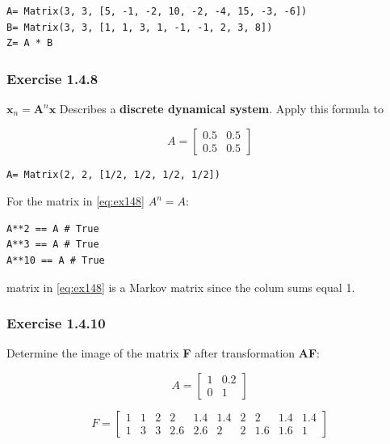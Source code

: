 \documentclass[a4paper]{article}
\begin{document}
\begin{verbatim}
A= Matrix(3, 3, [5, -1, -2, 10, -2, -4, 15, -3, -6])
B= Matrix(3, 3, [1, 1, 3, 1, -1, -1, 2, 3, 8])
Z= A * B
\end{verbatim}

\subsubsection{Exercise 1.4.8}

$\mathbf{x}_n = \mathbf{A}^n\mathbf{x}$ Describes a \textbf{discrete dynamical
system}. Apply this formula to

\begin{equation}\label{eq:ex148}
A = \left[\begin{matrix}0.5 & 0.5\\0.5 & 0.5\end{matrix}\right]
\end{equation}

\begin{verbatim}
A= Matrix(2, 2, [1/2, 1/2, 1/2, 1/2])
\end{verbatim}

For the matrix in \ref{eq:ex148} $A^n = A$:

\begin{verbatim}
A**2 == A # True
A**3 == A # True
A**10 == A # True
\end{verbatim}

matrix in \ref{eq:ex148} is a Markov matrix since the colum sums equal 1.

\subsubsection{Exercise 1.4.10}

Determine the image of the matrix \textbf{F} after transformation \textbf{AF}:

\begin{equation}
A = \left[\begin{matrix}1 & 0.2\\0 & 1\end{matrix}\right]
\end{equation}

\begin{equation}
F = \left[\begin{matrix}1 & 1 & 2 & 2 & 1.4 & 1.4 & 2 & 2 & 1.4 & 1.4\\1 & 3 & 3 & 2.6 & 2.6 & 2 & 2 & 1.6 & 1.6 & 1\end{matrix}\right]
\end{equation}
\end{document}
